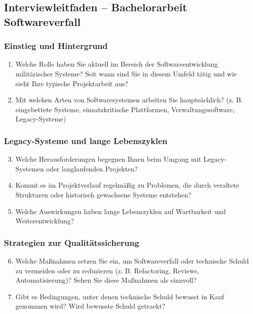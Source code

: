 \subsection*{Interviewleitfaden – Bachelorarbeit Softwareverfall}

\subsubsection*{Einstieg und Hintergrund}
\begin{enumerate}
    \item Welche Rolle haben Sie aktuell im Bereich der Softwareentwicklung militärischer Systeme? Seit wann sind Sie in diesem Umfeld tätig und wie sieht Ihre typische Projektarbeit aus?
    \item Mit welchen Arten von Softwaresystemen arbeiten Sie hauptsächlich? (z. B. eingebettete Systeme, einsatzkritische Plattformen, Verwaltungssoftware, Legacy-Systeme)
\end{enumerate}

\subsubsection*{Legacy-Systeme und lange Lebenszyklen}
\begin{enumerate}
    \setcounter{enumi}{2}
    \item Welche Herausforderungen begegnen Ihnen beim Umgang mit Legacy-Systemen oder langlaufenden Projekten?
    \item Kommt es im Projektverlauf regelmäßig zu Problemen, die durch veraltete Strukturen oder historisch gewachsene Systeme entstehen?
    \item Welche Auswirkungen haben lange Lebenszyklen auf Wartbarkeit und Weiterentwicklung?
\end{enumerate}

\subsubsection*{Strategien zur Qualitätssicherung}
\begin{enumerate}
    \setcounter{enumi}{5}
    \item Welche Maßnahmen setzen Sie ein, um Softwareverfall oder technische Schuld zu vermeiden oder zu reduzieren (z. B. Refactoring, Reviews, Automatisierung)? Sehen Sie diese Maßnahmen als sinnvoll?
    \item Gibt es Bedingungen, unter denen technische Schuld bewusst in Kauf genommen wird? Wird bewusste Schuld getrackt?
\end{enumerate}

